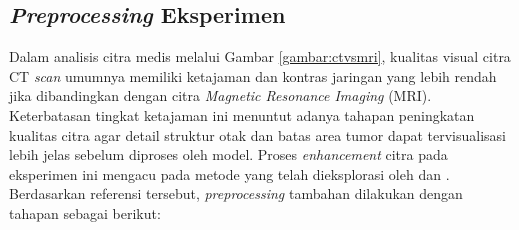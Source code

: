 \subsection{\textit{Preprocessing} Eksperimen}

Dalam analisis citra medis melalui Gambar \ref{gambar:ctvsmri}, kualitas visual citra CT \textit{scan} umumnya memiliki ketajaman dan kontras jaringan yang lebih rendah jika dibandingkan dengan citra \textit{Magnetic Resonance Imaging} (MRI). Keterbatasan tingkat ketajaman ini menuntut adanya tahapan peningkatan kualitas citra agar detail struktur otak dan batas area tumor dapat tervisualisasi lebih jelas sebelum diproses oleh model. Proses \textit{enhancement} citra pada eksperimen ini mengacu pada metode yang telah dieksplorasi oleh \textcite{putra2025enhanced} dan \textcite{flower2025performance}. Berdasarkan referensi tersebut, \textit{preprocessing} tambahan dilakukan dengan tahapan sebagai berikut:

